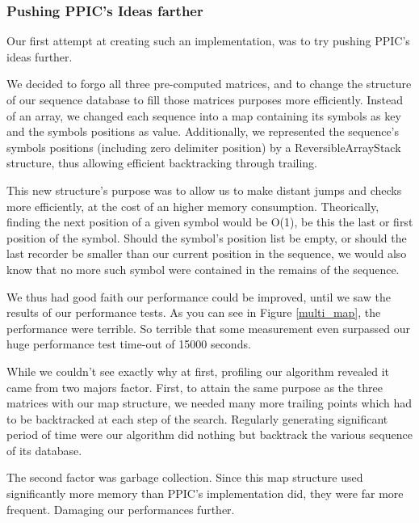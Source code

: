 \documentclass{eplmastersthesis}
\begin{document}
\subsubsection{Pushing PPIC's Ideas farther}

Our first attempt at creating such an implementation, was to try pushing PPIC's ideas further. \newline

We decided to forgo all three pre-computed matrices, and to change the structure of our sequence database to fill those matrices purposes more efficiently. Instead of an array, we changed each sequence into a map containing its symbols as key and the symbols positions as value. 
Additionally, we represented the sequence's symbols positions (including zero delimiter position) by a ReversibleArrayStack structure, thus allowing efficient backtracking through trailing. \newline

This new structure's purpose was to allow us to make distant jumps and checks more efficiently, at the cost of an higher memory consumption. Theorically, finding the next position of a given symbol would be O(1), be this the last or first position of the symbol. Should the symbol's position list be empty, or should the last recorder be smaller than our current position in the sequence, we would also know that no more such symbol were contained in the remains of the sequence. \newline

We thus had good faith our performance could be improved, until we saw the results of our performance tests. As you can see in Figure \ref{multi_map}, the performance were terrible. So terrible that some measurement even surpassed our huge performance test time-out of 15000 seconds. \newline

While we couldn't see exactly why at first, profiling our algorithm revealed it came from two majors factor. First, to attain the same purpose as the three matrices with our map structure, we needed many more trailing points which had to be backtracked at each step of the search. Regularly generating significant period of time were our algorithm did nothing but backtrack the various sequence of its database. \newline

The second factor was garbage collection. Since this map structure used significantly more memory than PPIC's implementation did, they were far more frequent. Damaging our performances further.
\end{document}
